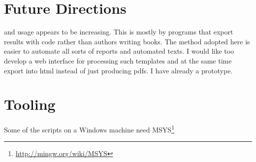 \section{Future Directions}

\latexe and \tex usage appears to be increasing. This is mostly by programs that export results with \latexe code rather than authors writing books.  The method adopted here is easier to automate all sorts of reports and automated texts. I would like too develop a web interface for processing such templates and at the same time export into html instead of just producing pdfs. I have already a prototype.   

\section{Tooling}

Some of the scripts on a Windows machine need MSYS\footnote{\url{http://mingw.org/wiki/MSYS}}








